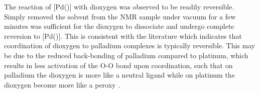 The reaction of [Pd(\tButhixantphos)] with dioxygen was observed to be readily reversible.  Simply removed the solvent from the NMR sample under vacuum for a few minutes was sufficient for the dioxygen to dissociate and undergo complete reversion to [Pd(\tButhixantphos)].  This is consistent with the literature which indicates that coordination of dioxygen to palladium complexes is typically reversible.  This may be due to the reduced back-bonding of palladium compared to platinum, which results in less activation of the O-O bond upon coordination, such that on palladium the dioxygen is more like a neutral  ligand while on platinum the dioxygen become more like a peroxy .  

%
%
%
